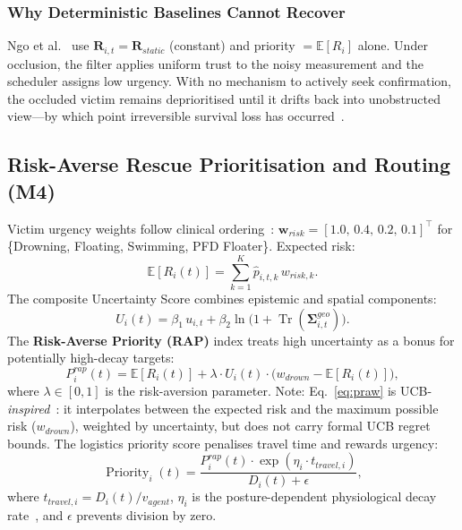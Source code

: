 \documentclass[11pt,a4paper]{article}
\begin{document}
\subsubsection{Why Deterministic Baselines Cannot Recover}

Ngo et al.~\cite{ref4} use $\mathbf{R}_{i,t} = \mathbf{R}_{static}$
(constant) and priority $= \mathbb{E}[R_i]$ alone.
Under occlusion, the filter applies uniform trust to the noisy measurement and
the scheduler assigns low urgency.
With no mechanism to actively seek confirmation, the occluded victim remains
deprioritised until it drifts back into unobstructed view---by which point
irreversible survival loss has occurred~\cite{tipton2011,bierens2016}.

\subsection{Risk-Averse Rescue Prioritisation and Routing (M4)}

Victim urgency weights follow clinical ordering~\cite{iamsar2019}:
$\mathbf{w}_{risk} = [1.0,\,0.4,\,0.2,\,0.1]^{\top}$ for
\{Drowning, Floating, Swimming, PFD Floater\}.
Expected risk:
\begin{equation}
  \mathbb{E}[R_i(t)] = \sum_{k=1}^K \hat{p}_{i,t,k}\,w_{risk,k}.
\end{equation}
The composite Uncertainty Score combines epistemic and spatial components:
\begin{equation}
  U_i(t) = \beta_1\,u_{i,t}
           + \beta_2\ln\!\bigl(1 + \operatorname{Tr}(\boldsymbol{\Sigma}^{geo}_{i,t})\bigr).
\end{equation}
The \textbf{Risk-Averse Priority (RAP)} index treats high uncertainty as a
bonus for potentially high-decay targets:
\begin{equation}
  P^{rap}_i(t)
  = \mathbb{E}[R_i(t)]
  + \lambda\cdot U_i(t)\cdot\bigl(w_{drown} - \mathbb{E}[R_i(t)]\bigr),
  \label{eq:praw}
\end{equation}
where $\lambda \in [0,1]$ is the risk-aversion parameter.
Note: Eq.~\ref{eq:praw} is UCB-\emph{inspired}~\cite{auer2002}: it interpolates
between the expected risk and the maximum possible risk ($w_{drown}$),
weighted by uncertainty, but does not carry formal UCB regret bounds.
The logistics priority score penalises travel time and rewards urgency:
\begin{equation}
  \operatorname{Priority}_i(t)
  = \frac{P^{rap}_i(t)\cdot\exp(\eta_i\cdot t_{travel,i})}{D_i(t) + \epsilon},
  \label{eq:priority}
\end{equation}
where $t_{travel,i} = D_i(t)/v_{agent}$,
$\eta_i$ is the posture-dependent physiological decay rate~\cite{bierens2016},
and $\epsilon$ prevents division by zero.
\end{document}
